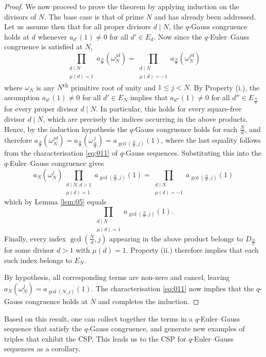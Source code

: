 \documentclass{article}
\numberwithin{equation}{section}
\theoremstyle{definition}
\begin{document}
\begin{proof}
\vspace{-2mm}
We now proceed to prove the theorem by applying induction on the divisors of $N$. The base case is that of prime $N$ and has already been addressed. Let us assume then that for all proper divisors $d\mid N$, the $q$-Gauss congruence holds at $d$ whenever $a_{d'}(1)\neq0$ for all $d'\in E_d$. Now since the $q$-Euler--Gauss congruence is satisfied at $N$, 
\[\prod_{\substack{d\mid N \\ \mu(d)=1}} a_\frac{N}{d}(\omega_N^{jd})
=\prod_{\substack{d\mid N \\ \mu(d)=-1}} a_\frac{N}{d}(\omega_N^{jd})
\]
where $\omega_N$ is any $N$\textsuperscript{th} primitive root of unity and $1\leq j<N$. By Property (i.), the assumption $a_{d'}(1)\neq 0$ for all $d'\in E_N$ implies that $a_{d''}(1)\neq 0$ for all $d''\in E_\frac{N}{d}$ for every proper divisor $d\mid N$. In particular, this holds for every square-free divisor $d\mid N$, which are precisely the indices occurring in the above products. Hence, by the induction hypothesis the $q$-Gauss congruence holds for each $\frac{N}{d}$, and therefore
$a_\frac{N}{d}(\omega_N^{jd})=a_\frac{N}{d}(\omega_\frac{N}{d}^{\,j})=a_{\gcd(\frac{N}{d},j)}(1)$,
where the last equality follows from the characterisation \eqref{eq:011} of $q$-Gauss sequences. Substituting this into the $q$-Euler--Gauss congruence gives
\[
a_N(\omega_N^j)\prod_{\substack{d\mid N, d>1\\\mu(d)=1}}a_{\gcd(\frac{N}{d},j)}(1)=\prod_{\substack{d\mid N\\\mu(d)=-1}}a_{\gcd(\frac{N}{d},j)}(1)
\]
which by Lemma \ref{lem:05} equals
\[
\prod_{\substack{d\mid N\\\mu(d)=1}}a_{\gcd(\frac{N}{d},j)}(1).
\]
Finally, every index $\gcd\left(\frac{N}{d},j\right)$ appearing in the above product belongs to $D_{\frac{N}{d}}$ for some divisor $d>1$ with $\mu(d)=1$. Property (ii.) therefore implies that each such index belongs to $E_N$. 

By hypothesis, all corresponding terms are non-zero and cancel, leaving $a_N(\omega_N^j)=a_{\gcd(N,j)}(1)$. The characterisation \eqref{eq:011} now implies that the $q$-Gauss congruence holds at $N$ and completes the induction. 
\end{proof}
Based on this result, one can collect together the terms in a $q$-Euler--Gauss sequence that satisfy the $q$-Gauss congruence, and generate new examples of triples that exhibit the CSP. This leads us to the CSP for $q$-Euler--Gauss sequences as a corollary.
\end{document}
